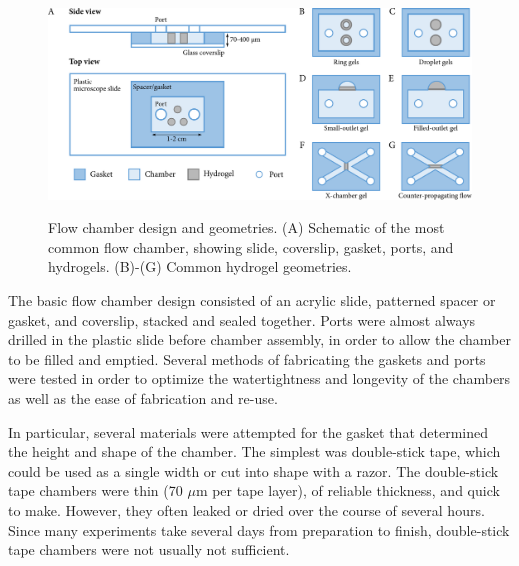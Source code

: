 \begin{figure}
\caption[Flow chamber design and geometries.]{Flow chamber design and geometries.  (A) Schematic of the most common flow chamber, showing slide, coverslip, gasket, ports, and hydrogels.  (B)-(G) Common hydrogel geometries.}
\centering
\includegraphics[width=\textwidth]{figs/ch03/methods-cartoon}
\label{fig:chamber-geometries}
\end{figure}

The basic flow chamber design consisted of an acrylic slide, patterned spacer or gasket, and coverslip, stacked and sealed together.  Ports were almost always drilled in the plastic slide before chamber assembly, in order to allow the chamber to be filled and emptied.  Several methods of fabricating the gaskets and ports were tested in order to optimize the watertightness and longevity of the chambers as well as the ease of fabrication and re-use.

In particular, several materials were attempted for the gasket that determined the height and shape of the chamber.  The simplest was double-stick tape, which could be used as a single width or cut into shape with a razor.  The double-stick tape chambers were thin (70 $\mu$m per tape layer), of reliable thickness, and quick to make.  However, they often leaked or dried over the course of several hours.  Since many experiments take several days from preparation to finish, double-stick tape chambers were not usually not sufficient.

